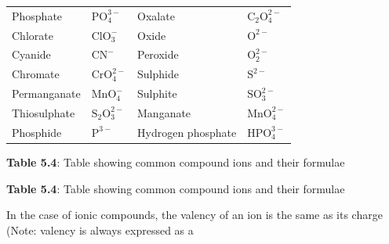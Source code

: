 \begin{table}[H]
\begin{center}
\begin{xtabular}[t]{|l|l|l|l|}
        Phosphate &
        $\mathrm{PO}_{4}^{3-}$ &
        Oxalate &
        ${\mathrm{C}}_{2}\mathrm{O}_{4}^{2-}$%
     \tabularnewline{}
        Chlorate &
        $\mathrm{ClO}_{3}^{-}$ &
        Oxide &
        ${\mathrm{O}}^{2-}$%
     \tabularnewline{}
        Cyanide &
        ${\mathrm{CN}}^{-}$ &
        Peroxide &
        $\mathrm{O}_{2}^{2-}$%
     \tabularnewline{}
        Chromate &
        $\mathrm{CrO}_{4}^{2-}$ &
        Sulphide &
        ${\mathrm{S}}^{2-}$%
     \tabularnewline{}
        Permanganate &
        $\mathrm{MnO}_{4}^{-}$ &
        Sulphite &
        $\mathrm{SO}_{3}^{2-}$%
     \tabularnewline{}
        Thiosulphate &
        ${\mathrm{S}}_{2}\mathrm{O}_{3}^{2-}$ &
        Manganate &
        $\mathrm{MnO}_{4}^{2-}$%
     \tabularnewline{}
        Phosphide &
        ${\mathrm{P}}^{3-}$ &
        Hydrogen phosphate &
        $\mathrm{HPO}_{4}^{3-}$%
     \tabularnewline{}
    \end{xtabular}
      \end{center}
    \begin{center}{\small\bfseries Table 5.4}: Table showing common compound ions and their formulae\end{center}
    \begin{caption}{\small\bfseries Table 5.4}: Table showing common compound ions and their formulae\end{caption}
\end{table}
    \par
        \label{m38689*id144609}In the case of ionic compounds, the valency of an ion is the same as its charge (Note: valency is always expressed as a
